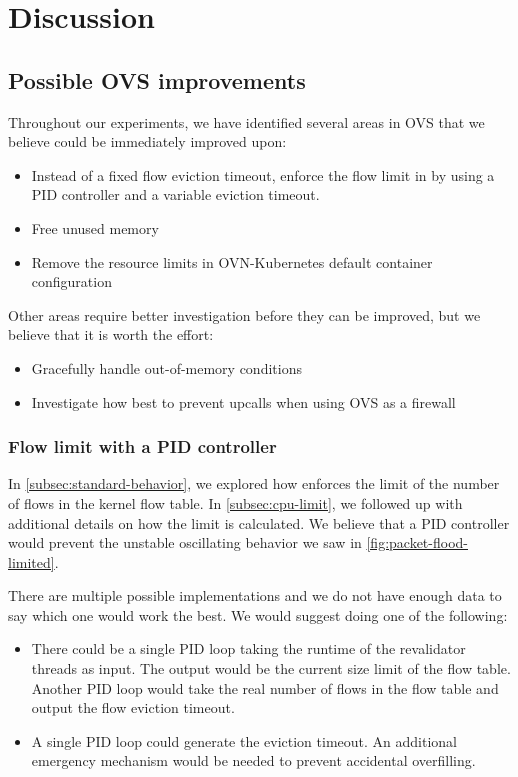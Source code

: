 \chapter{Discussion}
\label{chap:discussion}

\section{Possible OVS improvements}
\label{sec:improv}

Throughout our experiments, we have identified several areas in OVS that we believe could be immediately improved upon:

\begin{itemize}
    \item Instead of a fixed flow eviction timeout, enforce the flow limit in  by using a PID controller and a variable eviction timeout.
    \item Free unused memory
    \item Remove the resource limits in OVN-Kubernetes default container configuration
\end{itemize}

Other areas require better investigation before they can be improved, but we believe that it is worth the effort:

\begin{itemize}
    \item Gracefully handle out-of-memory conditions
    \item Investigate how best to prevent upcalls when using OVS as a firewall
\end{itemize}

\subsection{Flow limit with a PID controller}

In \cref{subsec:standard-behavior}, we explored how  enforces the limit of the number of flows in the kernel flow table. In \cref{subsec:cpu-limit}, we followed up with additional details on how the limit is calculated. We believe that a PID controller would prevent the unstable oscillating behavior we saw in \cref{fig:packet-flood-limited}.

There are multiple possible implementations and we do not have enough data to say which one would work the best. We would suggest doing one of the following:

\begin{itemize}
    \item There could be a single PID loop taking the runtime of the revalidator threads as input. The output would be the current size limit of the flow table. Another PID loop would take the real number of flows in the flow table and output the flow eviction timeout.

    \item A single PID loop could generate the eviction timeout. An additional emergency mechanism would be needed to prevent accidental overfilling.
\end{itemize}

